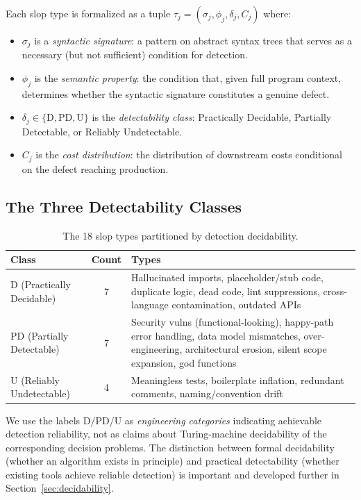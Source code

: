 \documentclass[11pt, a4paper, logo, copyright]{googledeepmind}
\begin{document}
Each slop type is formalized as a tuple $\tau_j = (\sigma_j, \phi_j, \delta_j, C_j)$ where:
\begin{itemize}[nosep]
    \item $\sigma_j$ is a \emph{syntactic signature}: a pattern on abstract syntax trees that serves as a necessary (but not sufficient) condition for detection.
    \item $\phi_j$ is the \emph{semantic property}: the condition that, given full program context, determines whether the syntactic signature constitutes a genuine defect.
    \item $\delta_j \in \{\mathrm{D}, \mathrm{PD}, \mathrm{U}\}$ is the \emph{detectability class}: Practically Decidable, Partially Detectable, or Reliably Undetectable.
    \item $C_j$ is the \emph{cost distribution}: the distribution of downstream costs conditional on the defect reaching production.
\end{itemize}

\subsection{The Three Detectability Classes}

\begin{table}[htbp]
\centering
\caption{The 18 slop types partitioned by detection decidability.}
\label{tab:slop-partition}
\small
\begin{tabularx}{\textwidth}{l c X}
\toprule
\textbf{Class} & \textbf{Count} & \textbf{Types} \\
\midrule
D (Practically Decidable) & 7 & Hallucinated imports, placeholder/stub code, duplicate logic, dead code, lint suppressions, cross-language contamination, outdated APIs \\
\addlinespace
PD (Partially Detectable) & 7 & Security vulns (functional-looking), happy-path error handling, data model mismatches, over-engineering, architectural erosion, silent scope expansion, god functions \\
\addlinespace
U (Reliably Undetectable) & 4 & Meaningless tests, boilerplate inflation, redundant comments, naming/convention drift \\
\bottomrule
\end{tabularx}
\end{table}

We use the labels D/PD/U as \emph{engineering categories} indicating achievable detection reliability, not as claims about Turing-machine decidability of the corresponding decision problems. The distinction between formal decidability (whether an algorithm exists in principle) and practical detectability (whether existing tools achieve reliable detection) is important and developed further in Section~\ref{sec:decidability}.
\end{document}
